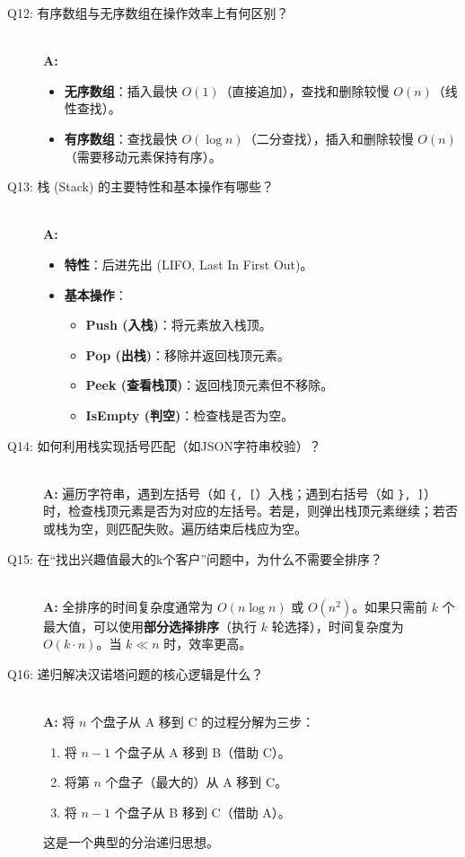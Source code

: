 \documentclass[a4paper,12pt]{article}
\begin{document}
\begin{description}
    \item[Q12: 有序数组与无序数组在操作效率上有何区别？] \hfill \\
    \textbf{A:}
    \begin{itemize}
        \item \textbf{无序数组}：插入最快 $O(1)$（直接追加），查找和删除较慢 $O(n)$（线性查找）。
        \item \textbf{有序数组}：查找最快 $O(\log n)$（二分查找），插入和删除较慢 $O(n)$（需要移动元素保持有序）。
    \end{itemize}

    \item[Q13: 栈 (Stack) 的主要特性和基本操作有哪些？] \hfill \\
    \textbf{A:}
    \begin{itemize}
        \item \textbf{特性}：后进先出 (LIFO, Last In First Out)。
        \item \textbf{基本操作}：
        \begin{itemize}
            \item \textbf{Push (入栈)}：将元素放入栈顶。
            \item \textbf{Pop (出栈)}：移除并返回栈顶元素。
            \item \textbf{Peek (查看栈顶)}：返回栈顶元素但不移除。
            \item \textbf{IsEmpty (判空)}：检查栈是否为空。
        \end{itemize}
    \end{itemize}

    \item[Q14: 如何利用栈实现括号匹配（如JSON字符串校验）？] \hfill \\
    \textbf{A:} 遍历字符串，遇到左括号（如 \texttt{\{, [}）入栈；遇到右括号（如 \texttt{\}, ]}）时，检查栈顶元素是否为对应的左括号。若是，则弹出栈顶元素继续；若否或栈为空，则匹配失败。遍历结束后栈应为空。

    \item[Q15: 在“找出兴趣值最大的k个客户”问题中，为什么不需要全排序？] \hfill \\
    \textbf{A:} 全排序的时间复杂度通常为 $O(n \log n)$ 或 $O(n^2)$。如果只需前 $k$ 个最大值，可以使用\textbf{部分选择排序}（执行 $k$ 轮选择），时间复杂度为 $O(k \cdot n)$。当 $k \ll n$ 时，效率更高。

    \item[Q16: 递归解决汉诺塔问题的核心逻辑是什么？] \hfill \\
    \textbf{A:} 将 $n$ 个盘子从 A 移到 C 的过程分解为三步：
    \begin{enumerate}
        \item 将 $n-1$ 个盘子从 A 移到 B（借助 C）。
        \item 将第 $n$ 个盘子（最大的）从 A 移到 C。
        \item 将 $n-1$ 个盘子从 B 移到 C（借助 A）。
    \end{enumerate}
    这是一个典型的分治递归思想。
\end{description}
\end{document}

